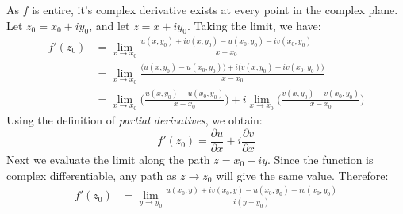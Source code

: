 \documentclass[crop=false,class=book,oneside]{standalone}
\begin{document}
            \begin{bproof}
                As $f$ is entire, it's complex derivative exists
                at every point in the complex plane.
                Let $z_{0}=x_{0}+iy_{0}$, and let
                $z=x+iy_{0}$. Taking the limit, we have:
                \begin{subequations}
                    \begin{align}
                        f'(z_{0})
                        &=\underset{x\rightarrow{x_{0}}}{\lim}
                        \frac{u(x,y_{0})+iv(x,y_{0})-
                              u(x_{0},y_{0})-iv(x_{0},y_{0})}
                             {x-x_{0}}\\
                        &=\underset{x\rightarrow{x_{0}}}{\lim}
                            \frac{\big(u(x,y_{0})-u(x_{0},y_{0})\big)
                            +i\big(v(x,y_{0})-iv(x_{0},y_{0})\big)}
                            {x-x_{0}}\\
                        &=\underset{x\rightarrow{x_{0}}}{\lim}
                        \Big(\frac{u(x,y_{0})-u(x_{0},y_{0})}
                                  {x-x_{0}}\Big)+
                        i\underset{x\rightarrow{x_{0}}}{\lim}   
                        \Big(\frac{v(x,y_{0})-v(x_{0},y_{0})}
                                  {x-x_{0}}\Big)
                    \end{align}
                \end{subequations}
                Using the definition of
                \textit{partial derivatives}, we obtain:
                \begin{equation}
                    \label{eqn:Cauchy_Riemann_x_Limit}
                    f'(z_{0})=
                    \frac{\partial{u}}{\partial{x}}+
                    i\frac{\partial{v}}{\partial{x}}
                \end{equation}
                Next we evaluate the limit along the path
                $z=x_{0}+iy$. Since the function is complex
                differentiable, any path as
                $z\rightarrow{z_{0}}$ will give the same value.
                Therefore:
                \begin{subequations}
                    \begin{align}
                        f'(z_{0})
                        &=\underset{y\rightarrow{y_{0}}}{\lim}
                        \frac{u(x_{0},y)+iv(x_{0},y)-
                              u(x_{0},y_{0})-iv(x_{0},y_{0})}
                             {i(y-y_{0})}\\

\end{align}
\end{subequations}
\end{bproof}
\end{document}
